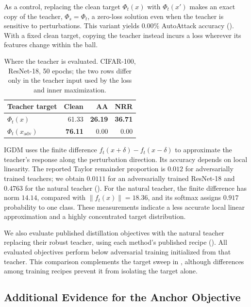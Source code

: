\documentclass{article} %
\theoremstyle{plain}
\begin{document}
As a control, replacing the clean target $\Phi_t(x)$ with $\Phi_t(x')$ makes an exact copy of the
teacher, $\Phi_s=\Phi_t$, a zero-loss solution even when the teacher is sensitive to perturbations.
This variant yields $0.00\%$ AutoAttack accuracy (). With a fixed clean target,
copying the teacher instead incurs a loss wherever its features change within the ball.

\begin{table}[!htbp]
  \centering \small \setlength{\tabcolsep}{5pt}
  \caption{Where the teacher is evaluated. CIFAR-100, ResNet-18, 50 epochs; the two rows differ only
  in the teacher input used by the loss and inner maximization.}
  \label{tab:teacherread}
  \begin{tabular}{lrrr}
    \toprule
    Teacher target & Clean & AA & NRR \\
    \midrule
    $\Phi_t(x)$                     & 61.33 & \textbf{26.19} & \textbf{36.71} \\
    $\Phi_t(x_{\mathrm{adv}})$      & \textbf{76.11} & 0.00 & 0.00 \\
    \bottomrule
  \end{tabular}
\end{table}

IGDM \citep{igdm} uses the finite difference $f_t(x+\delta)-f_t(x-\delta)$ to approximate the
teacher's response along the perturbation direction. Its accuracy depends on local linearity.
The reported Taylor remainder proportion is $0.012$ for adversarially trained teachers; we obtain
$0.0111$ for an adversarially trained ResNet-18 and $0.4763$ for the natural teacher
(). For the natural teacher, the finite difference has norm $14.14$, compared
with $\lVert f_t(x)\rVert=18.36$, and its softmax assigns $0.917$ probability to one class.
These measurements indicate a less accurate local linear approximation and a highly concentrated
target distribution.

We also evaluate published distillation objectives with the natural teacher replacing their robust
teacher, using each method's published recipe (). All evaluated objectives
perform below adversarial training initialized from that teacher. This comparison complements the
target sweep in , although differences among training recipes prevent it from
isolating the target alone.

\subsection{Additional Evidence for the Anchor Objective}
\label{app:anchor_measurements}
\label{sec:empirical_geometry}
\end{document}
